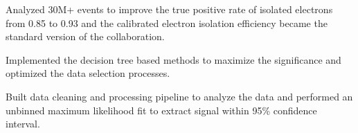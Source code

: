 \documentclass[letterpaper]{deedy-resume-openfont}
\begin{document}
\begin{tightemize}
\item Analyzed 30M+ events to improve the true positive rate of isolated electrons from 0.85 to 0.93 and the calibrated electron isolation efficiency became the standard version of the collaboration.
\item Implemented the decision tree based methods to maximize the significance and optimized the data selection processes.
\item Built data cleaning and processing pipeline to analyze the data and performed an unbinned maximum likelihood fit to extract signal within 95\% confidence interval.
\end{tightemize}
\sectionsep
\end{document}
